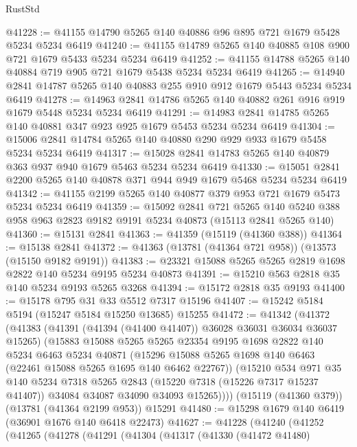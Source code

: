 \begin{lexlean}{RustStd}
\begin{coremodule}
@41228 := @41155 @14790 @5265 @140 @40886 @96 @895 @721 @1679 @5428 @5234 @5234 @6419
@41240 := @41155 @14789 @5265 @140 @40885 @108 @900 @721 @1679 @5433 @5234 @5234 @6419
@41252 := @41155 @14788 @5265 @140 @40884 @719 @905 @721 @1679 @5438 @5234 @5234 @6419
@41265 := @14940 @2841 @14787 @5265 @140 @40883 @255 @910 @912 @1679 @5443 @5234 @5234 @6419
@41278 := @14963 @2841 @14786 @5265 @140 @40882 @261 @916 @919 @1679 @5448 @5234 @5234 @6419
@41291 := @14983 @2841 @14785 @5265 @140 @40881 @347 @923 @925 @1679 @5453 @5234 @5234 @6419
@41304 := @15006 @2841 @14784 @5265 @140 @40880 @290 @929 @933 @1679 @5458 @5234 @5234 @6419
@41317 := @15028 @2841 @14783 @5265 @140 @40879 @363 @937 @940 @1679 @5463 @5234 @5234 @6419
@41330 := @15051 @2841 @2200 @5265 @140 @40878 @371 @944 @949 @1679 @5468 @5234 @5234 @6419
@41342 := @41155 @2199 @5265 @140 @40877 @379 @953 @721 @1679 @5473 @5234 @5234 @6419
@41359 := @15092
    @2841
    @721
    @5265
    @140
    @5240
    @388
    @958
    @963
    @2823
    @9182
    @9191
    @5234
    @40873
    (@15113 @2841 @5265 @140)
@41360 := @15131 @2841
@41363 := @41359 (@15119 (@41360 @388))
@41364 := @15138 @2841
@41372 := @41363 (@13781 (@41364 @721 @958)) (@13573 (@15150 @9182 @9191))
@41383 := @23321 @15088 @5265 @5265 @2819 @1698 @2822 @140 @5234 @9195 @5234 @40873
@41391 := @15210 @563 @2818 @35 @140 @5234 @9193 @5265 @3268
@41394 := @15172 @2818 @35 @9193
@41400 := @15178 @795 @31 @33 @5512 @7317 @15196
@41407 := @15242 @5184 @5194 (@15247 @5184 @15250 @13685) @15255
@41472 := @41342
    (@41372
      (@41383
        (@41391 (@41394 (@41400 @41407)) @36028 @36031 @36034 @36037 @15265)
        (@15883
          @15088
          @5265
          @5265
          @23354
          @9195
          @1698
          @2822
          @140
          @5234
          @6463
          @5234
          @40871
          (@15296 @15088 @5265 @1698 @140 @6463 (@22461 @15088 @5265 @1695 @140 @6462 @22767))
          (@15210
            @534
            @971
            @35
            @140
            @5234
            @7318
            @5265
            @2843
            (@15220 @7318 (@15226 @7317 @15237 @41407))
            @34084
            @34087
            @34090
            @34093
            @15265))))
    (@15119 (@41360 @379))
    (@13781 (@41364 @2199 @953))
    @15291
@41480 := @15298 @1679 @140 @6419 (@36901 @1676 @140 @6418 @22473)
@41627 := @41228
    (@41240
      (@41252
        (@41265
          (@41278
            (@41291
              (@41304
                (@41317
                  (@41330
                    (@41472 @41480)

\end{coremodule}
\end{lexlean}
